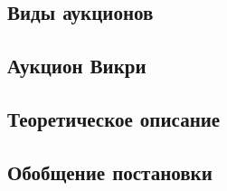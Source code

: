 

\subsection{Виды аукционов}



\subsection{Аукцион Викри}



\subsection{Теоретическое описание}



\subsection{Обобщение постановки}

